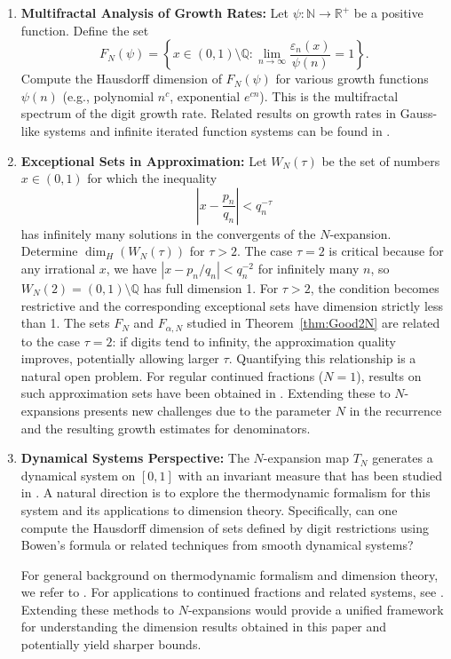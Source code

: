 \documentclass[12pt]{article}
\numberwithin{equation}{section}
\begin{document}
\begin{enumerate}
\item \textbf{Multifractal Analysis of Growth Rates:} Let $ \psi: \mathbb{N} \to \mathbb{R}^+ $ be a positive function. Define the set
\[
F_N(\psi) = \left\{ x \in (0,1)\setminus\mathbb{Q} : \lim_{n\to\infty} \frac{\varepsilon_n(x)}{\psi(n)} = 1 \right\}.
\]
Compute the Hausdorff dimension of $ F_N(\psi) $ for various growth functions $ \psi(n) $ (e.g., polynomial $ n^c $, exponential $ e^{cn} $). This is the multifractal spectrum of the digit growth rate.
{Related results on growth rates in Gauss-like systems and infinite iterated function systems can be found in \cite{J12, L22, STZ26, Zha20, Zha25}}.

\item \textbf{Exceptional Sets in Approximation:}
Let $W_N(\tau)$ be the set of numbers $x \in (0,1)$ for which the inequality
\[
\left|x - \frac{p_n}{q_n}\right| < q_n^{-\tau}
\]
has infinitely many solutions in the convergents of the $N$-expansion. Determine $\dim_H(W_N(\tau))$ for $\tau > 2$.
{
The case $\tau = 2$ is critical because for any irrational $x$, we have $|x - p_n/q_n| < q_n^{-2}$ for infinitely many $n$, so $W_N(2) = (0,1)\setminus\mathbb{Q}$ has full dimension 1. For $\tau > 2$, the condition becomes restrictive and the corresponding exceptional sets have dimension strictly less than 1. The sets $F_N$ and $F_{\alpha,N}$ studied in Theorem~\ref{thm:Good2N} are related to the case $\tau = 2$: if digits tend to infinity, the approximation quality improves, potentially allowing larger $\tau$. Quantifying this relationship is a natural open problem.}
{
For regular continued fractions ($N=1$), results on such approximation sets have been obtained in \cite{Philipp1970, TanZhou2024, WangWuXu2015}. Extending these to $N$-expansions presents new challenges due to the parameter $N$ in the recurrence and the resulting growth estimates for denominators.}

\item \textbf{Dynamical Systems Perspective:} The $N$-expansion map $T_N$ generates a dynamical system on $[0,1]$ with an invariant measure that has been studied in \cite{Lascu2016, Lascu2017, SebeLascu2020}. A natural direction is to explore the thermodynamic formalism for this system and its applications to dimension theory. Specifically, can one compute the Hausdorff dimension of sets defined by digit restrictions using Bowen's formula or related techniques from smooth dynamical systems?

{For general background on thermodynamic formalism and dimension theory, we refer to \cite{Falconer2004, MauldinUrbanski2003}. For applications to continued fractions and related systems, see \cite{Hensley2006, Iommi2010, Mayer1991, PollicottWeiss2009}. Extending these methods to $N$-expansions would provide a unified framework for understanding the dimension results obtained in this paper and potentially yield sharper bounds.}

\end{enumerate}
\end{document}

